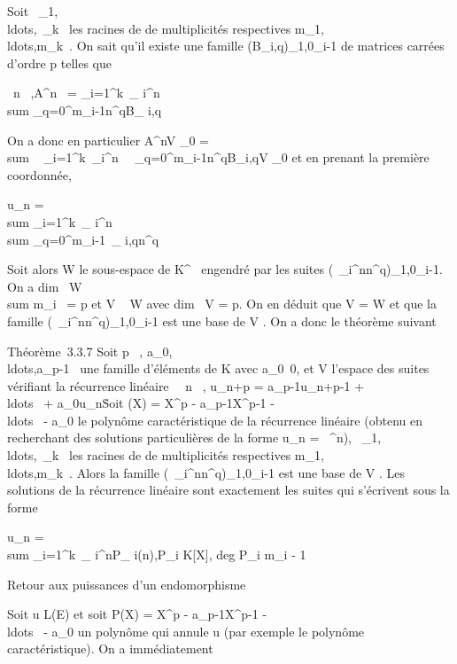\documentclass[]{article}
\begin{document}
Soit
\lambda~\_1,\\ldots,\lambda~\_k~
les racines de \chi de multiplicités respectives
m\_1,\\ldots,m\_k~.
On sait qu'il existe une famille
(B\_i,q)\_1\leqi\leqk,0\leqq\leqm\_i-1 de matrices carrées
d'ordre p telles que

\forall~n \in {}~,\quad A^n~ =
\sum \_i=1^k\lambda~\_ i^n~
\\sum
\_q=0^m\_i-1n^qB\_ i,q

On a donc en particulier A^nV \_0
= \\sum ~
\_i=1^k\lambda~\_i^n\
\sum ~
\_q=0^m\_i-1n^qB\_i,qV
\_0 et en prenant la première coordonnée,

u\_n = \\sum
\_i=1^k\lambda~\_ i^n \\sum
\_q=0^m\_i-1\alpha~\_ i,qn^q

Soit alors W le sous-espace de K^~ engendré par les suites
(\lambda~\_i^nn^q)\_1\leqi\leqk,0\leqq\leqm\_i-1.
On a dim~ W
\leq\\sum  m\_i~ = p
et V \subset~ W avec dim~ V = p. On en déduit que V =
W et que la famille
(\lambda~\_i^nn^q)\_1\leqi\leqk,0\leqq\leqm\_i-1
est une base de V . On a donc le théorème suivant

Théorème~3.3.7 Soit p \in {}~,
a\_0,\\ldots,a\_p-1~
une famille d'éléments de K avec
a\_0\neq~0, et V l'espace des suites
vérifiant la récurrence linéaire \forall~~n \in {}~,
u\_n+p = a\_p-1u\_n+p-1 +
\\ldots~ +
a\_0u\_n\. Soit \chi(X) = X^p -
a\_p-1X^p-1
-\\ldots~ -
a\_0 le polynôme caractéristique de la récurrence linéaire
(obtenu en recherchant des solutions particulières de la forme
u\_n = \lambda~^n),
\lambda~\_1,\\ldots,\lambda~\_k~
les racines de \chi de multiplicités respectives
m\_1,\\ldots,m\_k~.
Alors la famille
(\lambda~\_i^nn^q)\_1\leqi\leqk,0\leqq\leqm\_i-1
est une base de V . Les solutions de la récurrence linéaire sont
exactement les suites qui s'écrivent sous la forme

u\_n = \\sum
\_i=1^k\lambda~\_ i^nP\_
i(n),\quad P\_i \in K{[}X{]}, deg P\_i \leq
m\_i - 1

Retour aux puissances d'un endomorphisme

Soit u \in L(E) et soit P(X) = X^p -
a\_p-1X^p-1
-\\ldots~ -
a\_0 un polynôme qui annule u (par exemple le polynôme
caractéristique). On a immédiatement
\end{document}

